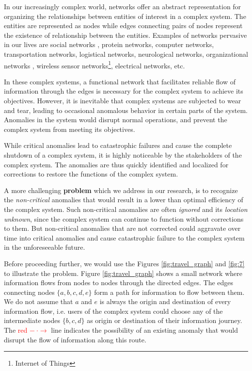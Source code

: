 \documentclass{sig-alternate}
\begin{document}
In our increasingly complex world, networks offer an abstract representation for organizing the relationships between entities of interest in a complex system. The entities are represented as nodes while edges connecting pairs of nodes represent the existence of relationship between the entities. Examples of networks pervasive in our lives are social networks \cite{Wu2004}, protein networks, computer networks, transportation networks, logistical networks, neurological networks, organizational networks \cite{Mihm2010}, wireless sensor networks\footnote{Internet of Things}, electrical networks, etc. 

In these complex systems, a functional network that facilitates reliable flow of information through the edges is necessary for the complex system to achieve its objectives. However, it is inevitable that complex systems are subjected to wear and tear, leading to occasional anomalous behavior in certain parts of the system. Anomalies in the system would disrupt normal operations, and prevent the complex system from meeting its objectives.

While critical anomalies lead to catastrophic failures and cause the complete shutdown of a complex system, it is highly noticeable by the stakeholders of the complex system. The anomalies are thus quickly identified and localized for corrections to restore the functions of the complex system.

A more challenging \textbf{problem} which we address in our research, is to recognize the \emph{non-critical} anomalies that would result in a lower than optimal efficiency of the complex system. Such non-critical anomalies are often \emph{ignored} and its \emph{location unknown}, since the complex system can continue to function without corrections to them. But non-critical anomalies that are not corrected could aggravate over time into critical anomalies and cause catastrophic failure to the complex system in the unforeseeable future. 

Before proceeding further, we would use the Figures \ref{fig:travel_graph} and \ref{fig:7} to illustrate the problem. Figure \ref{fig:travel_graph} shows a small network where information flows from nodes to nodes through the directed edges. The edges connecting nodes $\{a, b, c, d, e\}$ form a path for information to flow between them. We do not assume that $a$ and $e$ is always the origin and destination of every information flow, i.e. users of the complex system could choose any of the intermediate nodes $\{b, c, d\}$ as origin or destination of their information journey. The \textcolor{red}{red $- ~ \cdot \rightarrow$} line indicates the possibility of an existing anomaly that would disrupt the flow of information along this route.
\end{document}
